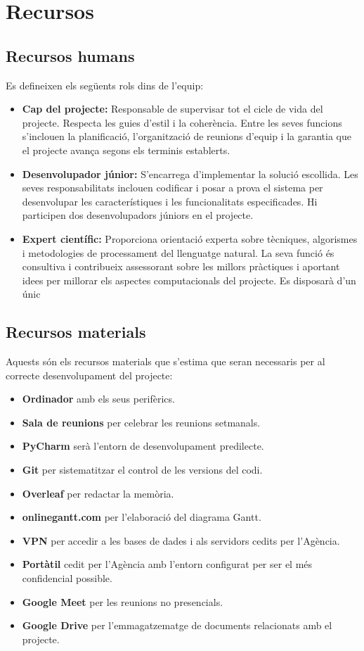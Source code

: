 \section{Recursos} \label{section:recursos}

\subsection{Recursos humans}
Es defineixen els següents rols dins de l'equip:

\begin{itemize}
    \item \textbf{Cap del projecte:} Responsable de supervisar tot el cicle de vida del projecte. Respecta les guies d'estil i la coherència. Entre les seves funcions s'inclouen la planificació, l'organització de reunions d'equip i la garantia que el projecte avança segons els terminis establerts.
    \item \textbf{Desenvolupador júnior:} S'encarrega d'implementar la solució escollida. Les seves responsabilitats inclouen codificar i posar a prova el sistema per desenvolupar les característiques i les funcionalitats especificades. Hi participen dos desenvolupadors júniors en el projecte.
    \item \textbf{Expert científic:} Proporciona orientació experta sobre tècniques, algorismes i metodologies de processament del llenguatge natural. La seva funció és consultiva i contribueix assessorant sobre les millors pràctiques i aportant idees per millorar els aspectes computacionals del projecte. Es disposarà d'un únic 
\end{itemize}

\subsection{Recursos materials}
Aquests són els recursos materials que s'estima que seran necessaris per al correcte desenvolupament del projecte:

\begin{itemize}
    \item \textbf{Ordinador} amb els seus perifèrics.
    \item \textbf{Sala de reunions} per celebrar les reunions setmanals.
    \item \textbf{PyCharm} serà l'entorn de desenvolupament predilecte.
    \item \textbf{Git} per sistematitzar el control de les versions del codi.
    \item \textbf{Overleaf} per redactar la memòria.
    \item \textbf{onlinegantt.com} per l'elaboració del diagrama Gantt.
    \item \textbf{VPN} per accedir a les bases de dades i als servidors cedits per l'Agència.
    \item \textbf{Portàtil} cedit per l'Agència amb l'entorn configurat per ser el més confidencial possible.
    \item \textbf{Google Meet} per les reunions no presencials.
    \item \textbf{Google Drive} per l'emmagatzematge de documents relacionats amb el projecte.
\end{itemize}
